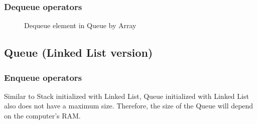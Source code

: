\subsubsection{Dequeue operators}
\begin{figure}[H]
    \centering
    \qquad
    \caption{Dequeue element in Queue by Array}%
    \label{fig:queueArrayDequeue}%
\end{figure}


\subsection{Queue (Linked List version)}
\subsubsection{Enqueue operators}
Similar to Stack initialized with Linked List, Queue initialized with Linked List also does not have a maximum size. Therefore, the size of the Queue will depend on the computer's RAM.\\

